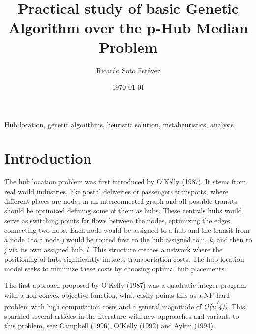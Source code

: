 \documentclass[onecolumn]{IEEEtran}
\author{Ricardo Soto Estévez}
\affil{Menendez Pelayo International University}
\date{\today}
\title{Practical study of basic Genetic Algorithm over the p-Hub Median Problem}
\begin{document}
\maketitle

\begin{abstract}  \end{abstract}

\begin{IEEEkeywords}
Hub location, genetic algorithms, heuristic solution, metaheuristics, analysis 
\end{IEEEkeywords}

\section{Introduction}

The hub location problem was first introduced by O'Kelly (1987)\cite{OKelly1987}. It stems from real world
industries, like postal deliveries or passengers transports, where different places are nodes in an
interconnected graph and all possible transits should be optimized defining some of them as hubs. These
centrals hubs would serve as switching points for flows between the nodes, optimizing the edges connecting
two hubs. Each node would be assigned to a hub and the transit from a node \emph{i} to a node \emph{j}
would be routed first to the hub assigned to ii, \emph{k}, and then to \emph{j} via its own assigned hub, 
\emph{l}. This structure creates a network where the positioning of hubs significantly 
impacts transportation costs. The hub location model seeks to minimize these costs by choosing optimal hub
placements.

The first approach proposed by O'Kelly (1987)\cite{OKelly1987} was a quadratic integer program with a
non-convex objective function, what easily points this as a NP-hard problem with high computation costs
and a general magnitude of \emph{O(n\textsuperscript(4))}. This sparkled several articles in the literature
with new approaches and variants to this problem, see: Campbell (1996)\cite{Campbell1996}, O'Kelly (1992)
\cite{OKelly1992} and Aykin (1994)\cite{Aykin1994}.
\end{document}
